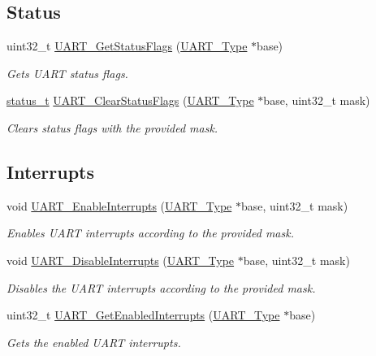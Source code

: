 \subsection*{Status}
\begin{DoxyCompactItemize}
\item 
uint32\+\_\+t \mbox{\hyperlink{group__uart__driver_ga28bf715678c0d3c8c3902e79455ee923}{U\+A\+R\+T\+\_\+\+Get\+Status\+Flags}} (\mbox{\hyperlink{struct_u_a_r_t___type}{U\+A\+R\+T\+\_\+\+Type}} $\ast$base)
\begin{DoxyCompactList}\small\item\em Gets U\+A\+RT status flags. \end{DoxyCompactList}\item 
\mbox{\hyperlink{group__ksdk__common_gaaabdaf7ee58ca7269bd4bf24efcde092}{status\+\_\+t}} \mbox{\hyperlink{group__uart__driver_gacc4cb85534361f836edca9454a6426c6}{U\+A\+R\+T\+\_\+\+Clear\+Status\+Flags}} (\mbox{\hyperlink{struct_u_a_r_t___type}{U\+A\+R\+T\+\_\+\+Type}} $\ast$base, uint32\+\_\+t mask)
\begin{DoxyCompactList}\small\item\em Clears status flags with the provided mask. \end{DoxyCompactList}\end{DoxyCompactItemize}
\subsection*{Interrupts}
\begin{DoxyCompactItemize}
\item 
void \mbox{\hyperlink{group__uart__driver_ga49ecd761481a22956e3f46285038719c}{U\+A\+R\+T\+\_\+\+Enable\+Interrupts}} (\mbox{\hyperlink{struct_u_a_r_t___type}{U\+A\+R\+T\+\_\+\+Type}} $\ast$base, uint32\+\_\+t mask)
\begin{DoxyCompactList}\small\item\em Enables U\+A\+RT interrupts according to the provided mask. \end{DoxyCompactList}\item 
void \mbox{\hyperlink{group__uart__driver_ga3f24b6b9b730046a9a81918f9abe7d99}{U\+A\+R\+T\+\_\+\+Disable\+Interrupts}} (\mbox{\hyperlink{struct_u_a_r_t___type}{U\+A\+R\+T\+\_\+\+Type}} $\ast$base, uint32\+\_\+t mask)
\begin{DoxyCompactList}\small\item\em Disables the U\+A\+RT interrupts according to the provided mask. \end{DoxyCompactList}\item 
uint32\+\_\+t \mbox{\hyperlink{group__uart__driver_ga79bc0b880286ec0dc0543606fc772912}{U\+A\+R\+T\+\_\+\+Get\+Enabled\+Interrupts}} (\mbox{\hyperlink{struct_u_a_r_t___type}{U\+A\+R\+T\+\_\+\+Type}} $\ast$base)
\begin{DoxyCompactList}\small\item\em Gets the enabled U\+A\+RT interrupts. \end{DoxyCompactList}\end{DoxyCompactItemize}
